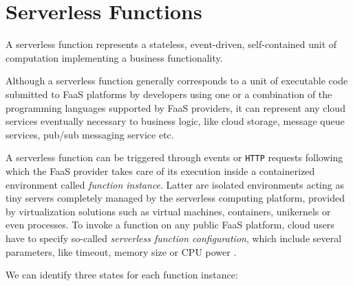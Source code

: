 \documentclass[12pt,a4paper]{report}
\begin{document}
\section{Serverless Functions}

A serverless function represents a stateless, event-driven, self-contained unit of computation implementing a business functionality.

Although a serverless function generally corresponds to a unit of executable code submitted to FaaS platforms by developers using one or a combination of the programming languages supported by FaaS providers, it can represent any cloud services eventually necessary to business logic, like cloud storage, message queue services, pub/sub messaging service etc.

A serverless function can be triggered through events or \texttt{HTTP} requests following which the FaaS provider takes care of its execution inside a containerized environment called \textit{function instance}. Latter are isolated environments acting as tiny servers completely managed by the serverless computing platform, provided by virtualization solutions such as virtual machines, containers, unikernels or even processes. To invoke a function on any public FaaS platform, cloud users have to specify so-called \textit{serverless function configuration}, which include several parameters, like timeout, memory size or CPU power \cite{COSE}.

We can identify three states for each function instance:
\end{document}
